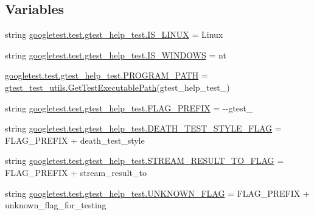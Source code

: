 \subsection*{Variables}
\begin{DoxyCompactItemize}
\item 
string \mbox{\hyperlink{namespacegoogletest_1_1test_1_1gtest__help__test_aa19ea7c5533b22651c1fe106f0555c0f}{googletest.\+test.\+gtest\+\_\+help\+\_\+test.\+I\+S\+\_\+\+L\+I\+N\+UX}} = \textquotesingle{}Linux\textquotesingle{}
\item 
string \mbox{\hyperlink{namespacegoogletest_1_1test_1_1gtest__help__test_a7195876d87720d6cf445f1ccfe2bc4d3}{googletest.\+test.\+gtest\+\_\+help\+\_\+test.\+I\+S\+\_\+\+W\+I\+N\+D\+O\+WS}} = \textquotesingle{}nt\textquotesingle{}
\item 
\mbox{\hyperlink{namespacegoogletest_1_1test_1_1gtest__help__test_a5bd5d40da9019419f2321edfcc1ebca5}{googletest.\+test.\+gtest\+\_\+help\+\_\+test.\+P\+R\+O\+G\+R\+A\+M\+\_\+\+P\+A\+TH}} = \mbox{\hyperlink{namespacegtest__test__utils_a89ed3717984a80ffbb7a9c92f71b86a2}{gtest\+\_\+test\+\_\+utils.\+Get\+Test\+Executable\+Path}}(\textquotesingle{}gtest\+\_\+help\+\_\+test\+\_\+\textquotesingle{})
\item 
string \mbox{\hyperlink{namespacegoogletest_1_1test_1_1gtest__help__test_abcdf68c576877303d231c0f463920b0b}{googletest.\+test.\+gtest\+\_\+help\+\_\+test.\+F\+L\+A\+G\+\_\+\+P\+R\+E\+F\+IX}} = \textquotesingle{}-\/-\/gtest\+\_\+\textquotesingle{}
\item 
string \mbox{\hyperlink{namespacegoogletest_1_1test_1_1gtest__help__test_ab4c417510ddf5d0080df15544c4fd366}{googletest.\+test.\+gtest\+\_\+help\+\_\+test.\+D\+E\+A\+T\+H\+\_\+\+T\+E\+S\+T\+\_\+\+S\+T\+Y\+L\+E\+\_\+\+F\+L\+AG}} = F\+L\+A\+G\+\_\+\+P\+R\+E\+F\+IX + \textquotesingle{}death\+\_\+test\+\_\+style\textquotesingle{}
\item 
string \mbox{\hyperlink{namespacegoogletest_1_1test_1_1gtest__help__test_ae7192f9cfd231c746962fcb20b2c03be}{googletest.\+test.\+gtest\+\_\+help\+\_\+test.\+S\+T\+R\+E\+A\+M\+\_\+\+R\+E\+S\+U\+L\+T\+\_\+\+T\+O\+\_\+\+F\+L\+AG}} = F\+L\+A\+G\+\_\+\+P\+R\+E\+F\+IX + \textquotesingle{}stream\+\_\+result\+\_\+to\textquotesingle{}
\item 
string \mbox{\hyperlink{namespacegoogletest_1_1test_1_1gtest__help__test_a54f37b46da97d7fcfb443a8c5d2a6c43}{googletest.\+test.\+gtest\+\_\+help\+\_\+test.\+U\+N\+K\+N\+O\+W\+N\+\_\+\+F\+L\+AG}} = F\+L\+A\+G\+\_\+\+P\+R\+E\+F\+IX + \textquotesingle{}unknown\+\_\+flag\+\_\+for\+\_\+testing\textquotesingle{}

\end{DoxyCompactItemize}
